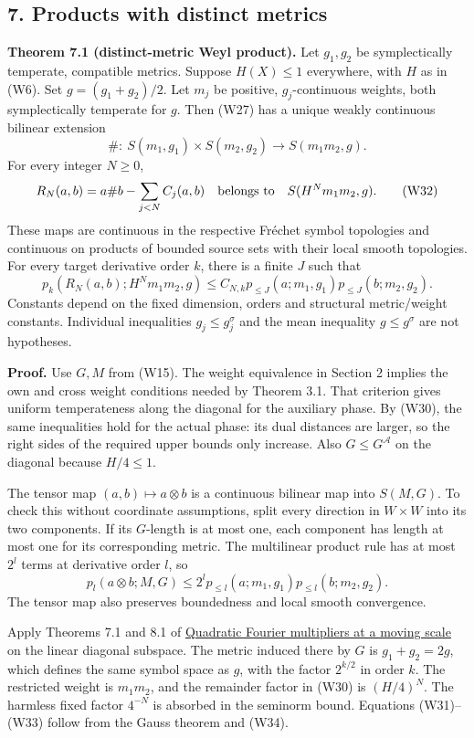 \documentclass[
  11pt,
]{article}
\begin{document}
\subsection{7. Products with distinct
metrics}\label{products-with-distinct-metrics}

\textbf{Theorem 7.1 (distinct-metric Weyl product).} Let \(g_1,g_2\) be
symplectically temperate, compatible metrics. Suppose \(H(X)\leq1\)
everywhere, with \(H\) as in (W6). Set \(g=(g_1+g_2)/2\). Let \(m_j\) be
positive, \(g_j\)-continuous weights, both symplectically temperate for
\(g\). Then (W27) has a unique weakly continuous bilinear extension \[
\#:\ S(m_1,g_1)\times S(m_2,g_2)\longrightarrow S(m_1m_2,g).
\tag{W31}
\] For every integer \(N\geq0\), \[
R_N(a,b)=a\#b-\sum_{j<N}C_j(a,b)
\quad\hbox{belongs to}\quad S(H^Nm_1m_2,g).
\tag{W32}
\] These maps are continuous in the respective Fréchet symbol topologies
and continuous on products of bounded source sets with their local
smooth topologies. For every target derivative order \(k\), there is a
finite \(J\) such that \[
p_k(R_N(a,b);H^Nm_1m_2,g)
\leq C_{N,k}
p_{\leq J}(a;m_1,g_1)p_{\leq J}(b;m_2,g_2).
\tag{W33}
\] Constants depend on the fixed dimension, orders and structural
metric/weight constants. Individual inequalities \(g_j\leq g_j^\sigma\)
and the mean inequality \(g\leq g^\sigma\) are not hypotheses.

\textbf{Proof.} Use \(G,M\) from (W15). The weight equivalence in
Section 2 implies the own and cross weight conditions needed by Theorem
3.1. That criterion gives uniform temperateness along the diagonal for
the auxiliary phase. By (W30), the same inequalities hold for the actual
phase: its dual distances are larger, so the right sides of the required
upper bounds only increase. Also \(G\leq G^{\mathcal A}\) on the
diagonal because \(H/4\leq1\).

The tensor map \((a,b)\mapsto a\otimes b\) is a continuous bilinear map
into \(S(M,G)\). To check this without coordinate assumptions, split
every direction in \(W\times W\) into its two components. If its
\(G\)-length is at most one, each component has length at most one for
its corresponding metric. The multilinear product rule has at most
\(2^l\) terms at derivative order \(l\), so \[
p_l(a\otimes b;M,G)
\leq2^l p_{\leq l}(a;m_1,g_1)p_{\leq l}(b;m_2,g_2).
\tag{W34}
\] The tensor map also preserves boundedness and local smooth
convergence.

Apply Theorems 7.1 and 8.1 of
\href{gauss-transform-estimates.pdf}{Quadratic Fourier multipliers at a
moving scale} on the linear diagonal subspace. The metric induced there
by \(G\) is \(g_1+g_2=2g\), which defines the same symbol space as
\(g\), with the factor \(2^{k/2}\) in order \(k\). The restricted weight
is \(m_1m_2\), and the remainder factor in (W30) is \((H/4)^N\). The
harmless fixed factor \(4^{-N}\) is absorbed in the seminorm bound.
Equations (W31)--(W33) follow from the Gauss theorem and (W34).
\end{document}
